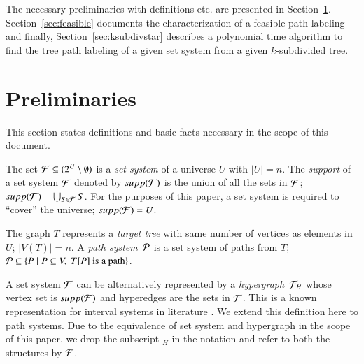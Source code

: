 \documentclass[synopsis,MS]             %
              {iitmdiss}
\begin{document}

 The necessary preliminaries with definitions
etc. are presented in
Section~\ref{sec:prelims}. Section~\ref{sec:feasible} documents the
characterization of a feasible path labeling and finally,
Section~\ref{sec:ksubdivstar} describes a polynomial time algorithm to
find the tree path labeling of a given set system from a given
$k$-subdivided tree.

\section{Preliminaries} 
\label{sec:prelims} 

This section states definitions and basic facts necessary in the scope
of this document.

\def\xnoindent {}

The set ${\mathcal F} \subseteq (2^{U} \setminus \emptyset)$ is a {\em set
  system} of a universe $U$ with $|U| = n$.  The {\em support} of a
set system ${\mathcal F}$ denoted by $supp({\cal F})$ is the union of all the sets in
${\mathcal F}$; $supp({\mathcal F}) = \bigcup_{S \in {\mathcal F}}S$. For the purposes of this
paper, a set system is required to ``cover'' the universe; $
supp({\cal F}) = U$.

\xnoindent The graph $T$ represents a {\em target tree} with same
number of vertices as elements in $U$; $|V(T)| = n$.  A {\em path
  system}\, ${\cal P}$ is a set system of paths from $T$; ${\cal P} \subseteq \{P
\mid P \subseteq V, \text{ } T[P] \text{ is a path} \}$.

\xnoindent
A set system ${\cal F}$ can be alternatively represented by a {\em
  hypergraph}\, ${\cal F}_H$ whose vertex set is $supp({\cal F})$ and hyperedges
are the sets in ${\cal F}$. This is a known representation for interval
systems in literature \cite{bls99,kklv10}.  We extend this definition here to
path systems. Due to the equivalence of set system and hypergraph in
the scope of this paper, we drop the
subscript $_H$ in the notation and refer to both the structures by ${\cal F}$.
\end{document}
